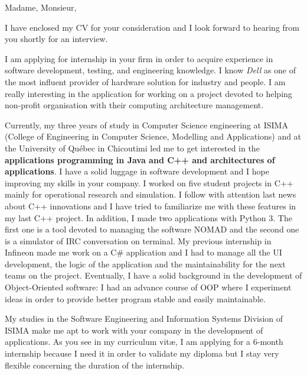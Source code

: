 
\date{\today}
\opening{Madame, Monsieur,}
\closing{I have enclosed my CV for your consideration and I look forward to hearing from you shortly for an interview.}

\makelettertitle

I am applying for internship in your firm in order to acquire experience in software development, testing, and engineering knowledge. I know \textit{Dell} as one of the most influent provider of hardware solution for industry and people. I am really interesting in the application for working on a project devoted to helping non-profit organisation with their computing architecture management.

Currently, my three years of study in Computer Science engineering at ISIMA (College of Engineering in Computer Science, Modelling and Applications) and at the University of Québec in Chicoutimi led me to get interested in the \textbf{applications programming in Java and C++ and architectures of applications}. I have a solid luggage in software development and I hope improving my skills in your company. I worked on five student projects in C++ mainly for operational research and simulation. I follow with attention last news about C++ innovations and I have tried to familiarize me with these features in my last C++ project. In addition, I made two applications with Python 3. The first one is a tool devoted to managing the software NOMAD and the second one is a simulator of IRC conversation on terminal. My previous internship in Infineon made me work on a C\# application and I had to manage all the UI development, the logic of the application and the maintainability for the next teams on the project. Eventually, I have a solid background in the development of Object-Oriented software: I had an advance course of OOP where I experiment ideas in order to provide better program stable and easily maintainable.

My studies in the Software Engineering and Information Systems Division of ISIMA make me apt to work with your company in the development of applications. As you see in my curriculum vit\ae{}, I am applying for a 6-month internship because I need it in order to validate my diploma but I stay very flexible concerning the duration of the internship.

\makeletterclosing
